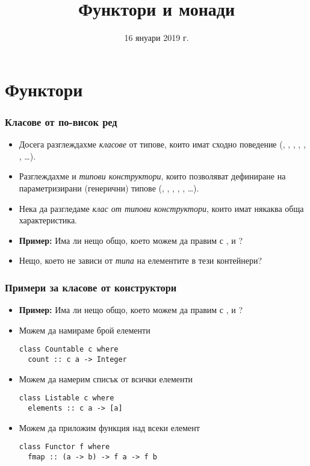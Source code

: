 \documentclass[alsotrans]{beamerswitch}
\title{Функтори и монади}
\date{16 януари 2019 г.}
\begin{document}
\begin{frame}
  \titlepage
\end{frame}

\section{Функтори}

\begin{frame}[fragile]
  \frametitle{Класове от по-висок ред}

  \begin{itemize}[<+->]
  \item Досега разглеждахме \emph{класове} от типове, които имат
    сходно поведение (, , , ,
    , , \ldots).
  \item
    Разглеждахме и \emph{типови конструктори}, които позволяват дефиниране на параметризирани (генерични) типове (, \lst{[]}, , , , \ldots).
  \item
    Нека да разгледаме \emph{клас от типови конструктори}, които имат някаква обща характеристика.
  \item
    \textbf{Пример:} Има ли нещо общо, което можем да правим с \lst{[]},  и ?
  \item Нещо, което не зависи от \emph{типа} на елементите в тези контейнери?
  \end{itemize}
\end{frame}

\begin{frame}[fragile]
  \frametitle{Примери за класове от конструктори}
  \begin{itemize}[<+->]
  \item
    \textbf{Пример:} Има ли нещо общо, което можем да правим с \lst{[]},  и ?
  \item Можем да намираме брой елементи
\begin{lstlisting}
class Countable c where
  count :: c a -> Integer
\end{lstlisting}
  \item Можем да намерим списък от всички елементи
\begin{lstlisting}
class Listable c where
  elements :: c a -> [a]
\end{lstlisting}
  \item Можем да приложим функция над всеки елемент
\begin{lstlisting}
class Functor f where
  fmap :: (a -> b) -> f a -> f b
\end{lstlisting}
\end{itemize}
\end{frame}
\end{document}
